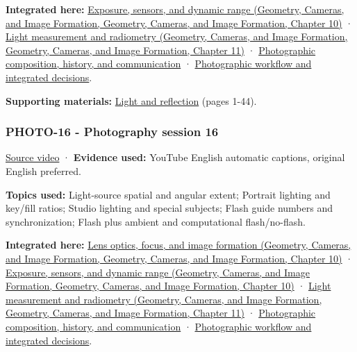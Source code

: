 \textbf{Integrated here:} \href{../03-Geometry-Cameras-and-Image-Formation/main.pdf\#nameddest=03-visual-computing-i-ch003-exposure-sensors-and-dynamic-range}{Exposure, sensors, and dynamic range (Geometry, Cameras, and Image Formation, Geometry, Cameras, and Image Formation, Chapter 10)} · \href{../03-Geometry-Cameras-and-Image-Formation/main.pdf\#nameddest=03-visual-computing-i-ch004-light-measurement-and-radiometry}{Light measurement and radiometry (Geometry, Cameras, and Image Formation, Geometry, Cameras, and Image Formation, Chapter 11)} · \hyperref[04-visual-computing-ii-ch034-photographic-composition-history-and-communication]{Photographic composition, history, and communication} · \hyperref[04-visual-computing-ii-ch034-photographic-workflow-and-integrated-decisions]{Photographic workflow and integrated decisions}.

\textbf{Supporting materials:} \href{https://drive.google.com/open?id=0B6w2XfPHEcZYNHdYdjhMakktS28}{Light and reflection} (pages 1-44).

\subsubsection{PHOTO-16 - Photography session 16}\label{04-visual-computing-ii-ch036-photo-16---photography-session-16}

\href{https://www.youtube.com/watch?v=gy-6WhxVIqc}{Source video} · \textbf{Evidence used:} YouTube English automatic captions, original English preferred.

\textbf{Topics used:} Light-source spatial and angular extent; Portrait lighting and key/fill ratios; Studio lighting and special subjects; Flash guide numbers and synchronization; Flash plus ambient and computational flash/no-flash.

\textbf{Integrated here:} \href{../03-Geometry-Cameras-and-Image-Formation/main.pdf\#nameddest=03-visual-computing-i-ch003-lens-optics-focus-and-image-formation}{Lens optics, focus, and image formation (Geometry, Cameras, and Image Formation, Geometry, Cameras, and Image Formation, Chapter 10)} · \href{../03-Geometry-Cameras-and-Image-Formation/main.pdf\#nameddest=03-visual-computing-i-ch003-exposure-sensors-and-dynamic-range}{Exposure, sensors, and dynamic range (Geometry, Cameras, and Image Formation, Geometry, Cameras, and Image Formation, Chapter 10)} · \href{../03-Geometry-Cameras-and-Image-Formation/main.pdf\#nameddest=03-visual-computing-i-ch004-light-measurement-and-radiometry}{Light measurement and radiometry (Geometry, Cameras, and Image Formation, Geometry, Cameras, and Image Formation, Chapter 11)} · \hyperref[04-visual-computing-ii-ch034-photographic-composition-history-and-communication]{Photographic composition, history, and communication} · \hyperref[04-visual-computing-ii-ch034-photographic-workflow-and-integrated-decisions]{Photographic workflow and integrated decisions}.

